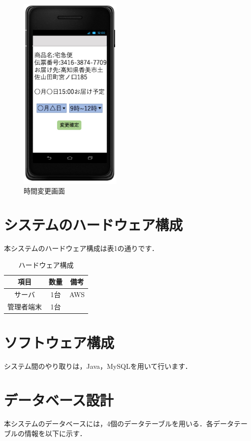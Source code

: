 \documentclass[a4j,titlepage]{jarticle}
\begin{document}
\begin{figure}[htbp]
 \begin{center}
  \includegraphics[width=50mm]{time_change}
	\caption{時間変更画面}
	\label{fig:time_change}
 \end{center}

\end{figure}

\section{システムのハードウェア構成}
本システムのハードウェア構成は表1の通りです．
\begin{table}[htbp]
\begin{center}
 \caption{ハードウェア構成}
  \begin{tabular}{|c|c|c|}\hline
    項目 & 数量 & 備考\\ \hline \hline
    サーバ & 1台 & AWS\\ \hline
    管理者端末 & 1台 & \\ \hline
  \end{tabular}
\end{center}
\end{table}


\section{ソフトウェア構成}
システム間のやり取りは，Java，MySQLを用いて行います．

\section{データベース設計}
本システムのデータベースには，4個のデータテーブルを用いる．各データテーブルの情報を以下に示す．
\end{document}
